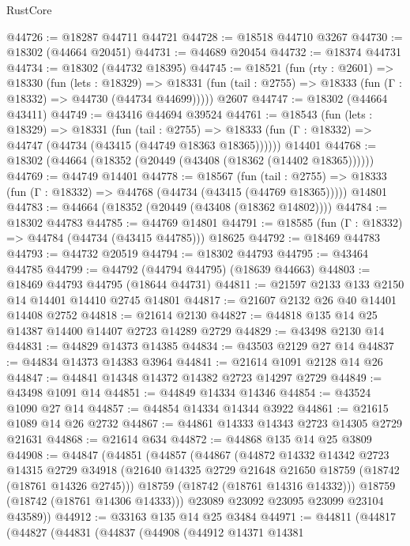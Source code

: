 \begin{lexlean}{RustCore}
\begin{coremodule}
@44726 := @18287 @44711 @44721
@44728 := @18518 @44710 @3267
@44730 := @18302 (@44664 @20451)
@44731 := @44689 @20454
@44732 := @18374 @44731
@44734 := @18302 (@44732 @18395)
@44745 := @18521
    (fun (rty : @2601) =>
    @18330
      (fun (lets : @18329) =>
      @18331 (fun (tail : @2755) => @18333 (fun (Γ : @18332) => @44730 (@44734 @44699)))))
    @2607
@44747 := @18302 (@44664 @43411)
@44749 := @43416 @44694 @39524
@44761 := @18543
    (fun (lets : @18329) =>
    @18331
      (fun (tail : @2755) =>
      @18333 (fun (Γ : @18332) => @44747 (@44734 (@43415 (@44749 @18363 @18365))))))
    @14401
@44768 := @18302 (@44664 (@18352 (@20449 (@43408 (@18362 (@14402 @18365))))))
@44769 := @44749 @14401
@44778 := @18567
    (fun (tail : @2755) => @18333 (fun (Γ : @18332) => @44768 (@44734 (@43415 (@44769 @18365)))))
    @14801
@44783 := @44664 (@18352 (@20449 (@43408 (@18362 @14802))))
@44784 := @18302 @44783
@44785 := @44769 @14801
@44791 := @18585 (fun (Γ : @18332) => @44784 (@44734 (@43415 @44785))) @18625
@44792 := @18469 @44783
@44793 := @44732 @20519
@44794 := @18302 @44793
@44795 := @43464 @44785
@44799 := @44792 (@44794 @44795) (@18639 @44663)
@44803 := @18469 @44793 @44795 (@18644 @44731)
@44811 := @21597 @2133 @133 @2150 @14 @14401 @14410 @2745 @14801
@44817 := @21607 @2132 @26 @40 @14401 @14408 @2752
@44818 := @21614 @2130
@44827 := @44818 @135 @14 @25 @14387 @14400 @14407 @2723 @14289 @2729
@44829 := @43498 @2130 @14
@44831 := @44829 @14373 @14385
@44834 := @43503 @2129 @27 @14
@44837 := @44834 @14373 @14383 @3964
@44841 := @21614 @1091 @2128 @14 @26
@44847 := @44841 @14348 @14372 @14382 @2723 @14297 @2729
@44849 := @43498 @1091 @14
@44851 := @44849 @14334 @14346
@44854 := @43524 @1090 @27 @14
@44857 := @44854 @14334 @14344 @3922
@44861 := @21615 @1089 @14 @26 @2732
@44867 := @44861 @14333 @14343 @2723 @14305 @2729 @21631
@44868 := @21614 @634
@44872 := @44868 @135 @14 @25 @3809
@44908 := @44847
    (@44851
      (@44857
        (@44867
          (@44872
            @14332
            @14342
            @2723
            @14315
            @2729
            @34918
            (@21640 @14325 @2729 @21648 @21650 @18759 (@18742 (@18761 @14326 @2745)))
            @18759
            (@18742 (@18761 @14316 @14332)))
          @18759
          (@18742 (@18761 @14306 @14333)))
        @23089
        @23092
        @23095
        @23099
        @23104
        @43589))
@44912 := @33163 @135 @14 @25 @3484
@44971 := @44811
    (@44817
      (@44827
        (@44831
          (@44837
            (@44908
              (@44912
                @14371
                @14381

\end{coremodule}
\end{lexlean}
